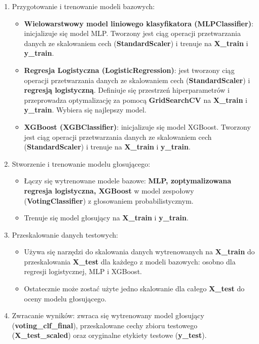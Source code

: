\begin{enumerate}
	\def\labelenumi{\arabic{enumi}.}
	\item
	      Przygotowanie i trenowanie modeli bazowych:
	      \begin{itemize}
		      \item
		            \textbf{Wielowarstwowy model liniowego klasyfikatora (MLPClassifier)}: inicjalizuje się model MLP. Tworzony jest ciąg operacji przetwarzania danych ze skalowaniem cech (\textbf{StandardScaler}) i trenuje na \textbf{X\_train} i \textbf{y\_train}.
		      \item
		            \textbf{Regresja Logistyczna (LogisticRegression)}: jest tworzony ciąg operacji przetwarzania danych ze skalowaniem cech (\textbf{StandardScaler}) i \textbf{regresją logistyczną}. Definiuje się przestrzeń hiperparametrów i przeprowadza optymalizację za pomocą \textbf{GridSearchCV} na \textbf{X\_train} i \textbf{y\_train}. Wybiera się najlepszy model.
		      \item
		            \textbf{XGBoost (XGBClassifier)}: inicjalizuje się model XGBoost. Tworzony jest ciąg operacji przetwarzania danych ze skalowaniem cech (\textbf{StandardScaler}) i trenuje na \textbf{X\_train} i \textbf{y\_train}.
	      \end{itemize}
	\item
	      Stworzenie i trenowanie modelu głosującego:
	      \begin{itemize}
		      \item Łączy się wytrenowane modele bazowe: \textbf{MLP, zoptymalizowana regresja logistyczna, XGBoost} w model zespołowy (\textbf{VotingClassifier}) z głosowaniem probabilistycznym.
		      \item Trenuje się model głosujący na \textbf{X\_train} i \textbf{y\_train}.
	      \end{itemize}
	\item
	      Przeskalowanie danych testowych:
	      \begin{itemize}
		      \item Używa się narzędzi do skalowania danych wytrenowanych na \textbf{X\_train} do przeskalowania \textbf{X\_test} dla każdego z modeli bazowych: osobno dla regresji logistycznej, MLP i XGBoost.
		      \item Ostatecznie może zostać użyte jedno skalowanie dla całego \textbf{X\_test} do oceny modelu głosującego.
	      \end{itemize}
	\item
	      Zwracanie wyników: zwraca się wytrenowany model głosujący (\textbf{voting\_clf\_final}), przeskalowane cechy zbioru testowego (\textbf{X\_test\_scaled}) oraz oryginalne etykiety testowe (\textbf{y\_test}).
\end{enumerate}

